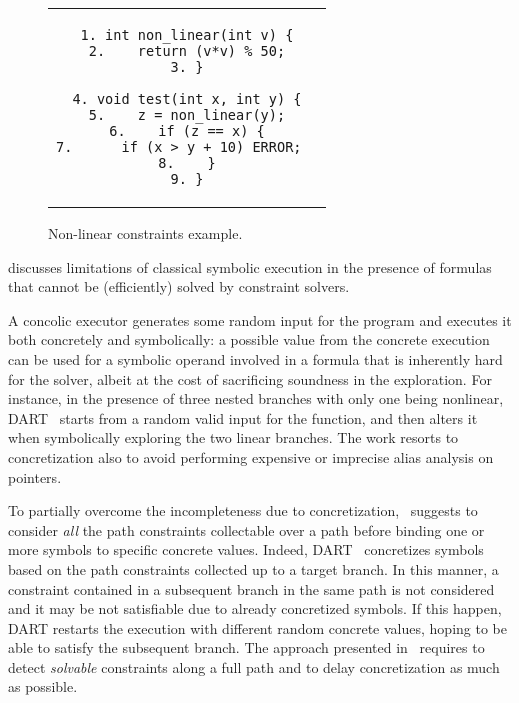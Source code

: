 \begin{figure}[t]
\begin{center}
\begin{tabular}{c}
\begin{lstlisting}[basicstyle=\ttfamily\small]
1. int non_linear(int v) {
2.    return (v*v) % 50;
3. }

4. void test(int x, int y) {
5.    z = non_linear(y);
6.    if (z == x) {
7.      if (x > y + 10) ERROR;  
8.    }
9. }
\end{lstlisting}
\end{tabular}
\end{center}
\caption{Non-linear constraints example.}
\label{fi:non-linear-constraints}
\end{figure}


\medskip{}
\cite{CS-CACM13} discusses limitations of classical symbolic execution in the presence of formulas that cannot be (efficiently) solved by constraint solvers. 


\noindent A concolic executor generates some random input for the program and executes it both concretely and symbolically: a possible value from the concrete execution can be used for a symbolic operand involved in a formula that is inherently hard for the solver, albeit at the cost of sacrificing soundness in the exploration. For instance, in the presence of three nested branches with only one being nonlinear, {\sc DART}~\cite{DART-PLDI05} starts from a random valid input for the function, and then alters it when symbolically exploring the two linear branches. The work resorts to concretization also to avoid performing expensive or imprecise alias analysis on pointers. %

To partially overcome the incompleteness due to concretization,~\cite{PRV-ISSTA11} suggests to consider {\em all} the path constraints collectable over a path before binding one or more symbols to specific concrete values. Indeed, {\sc DART}~\cite{DART-PLDI05} concretizes symbols based on the path constraints collected up to a target branch. In this manner, a constraint contained in a subsequent branch in the same path is not considered and it may be not satisfiable due to already concretized symbols. If this happen, {\sc DART} restarts the execution with different random concrete values, hoping to be able to satisfy the subsequent branch. The approach presented in~\cite{PRV-ISSTA11} requires to detect {\em solvable} constraints along a full path and to delay concretization as much as possible.

